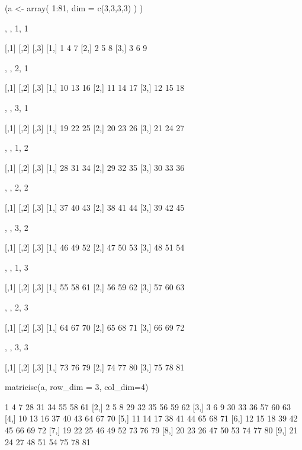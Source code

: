 \documentclass[article]{jss}
\begin{document}
\begin{CodeChunk}
\begin{CodeInput}
(a <- array( 1:81, dim = c(3,3,3,3) ) )
\end{CodeInput}
\begin{CodeOutput}
, , 1, 1

     [,1] [,2] [,3]
[1,]    1    4    7
[2,]    2    5    8
[3,]    3    6    9

, , 2, 1

     [,1] [,2] [,3]
[1,]   10   13   16
[2,]   11   14   17
[3,]   12   15   18

, , 3, 1

     [,1] [,2] [,3]
[1,]   19   22   25
[2,]   20   23   26
[3,]   21   24   27

, , 1, 2

     [,1] [,2] [,3]
[1,]   28   31   34
[2,]   29   32   35
[3,]   30   33   36

, , 2, 2

     [,1] [,2] [,3]
[1,]   37   40   43
[2,]   38   41   44
[3,]   39   42   45

, , 3, 2

     [,1] [,2] [,3]
[1,]   46   49   52
[2,]   47   50   53
[3,]   48   51   54

, , 1, 3

     [,1] [,2] [,3]
[1,]   55   58   61
[2,]   56   59   62
[3,]   57   60   63

, , 2, 3

     [,1] [,2] [,3]
[1,]   64   67   70
[2,]   65   68   71
[3,]   66   69   72

, , 3, 3

     [,1] [,2] [,3]
[1,]   73   76   79
[2,]   74   77   80
[3,]   75   78   81
\end{CodeOutput}
\end{CodeChunk}

\begin{CodeChunk}
\begin{CodeInput}
matricise(a, row_dim = 3, col_dim=4)
\end{CodeInput}
\begin{CodeOutput}
      [,1] [,2] [,3] [,4] [,5] [,6] [,7] [,8] [,9]
 [1,]    1    4    7   28   31   34   55   58   61
 [2,]    2    5    8   29   32   35   56   59   62
 [3,]    3    6    9   30   33   36   57   60   63
 [4,]   10   13   16   37   40   43   64   67   70
 [5,]   11   14   17   38   41   44   65   68   71
 [6,]   12   15   18   39   42   45   66   69   72
 [7,]   19   22   25   46   49   52   73   76   79
 [8,]   20   23   26   47   50   53   74   77   80
 [9,]   21   24   27   48   51   54   75   78   81
\end{CodeOutput}
\end{CodeChunk}
\end{document}
